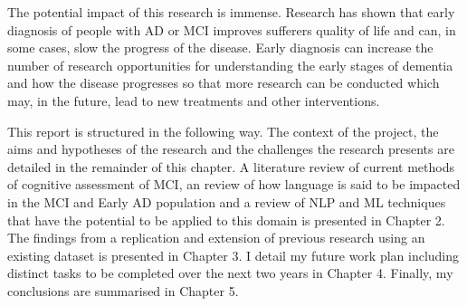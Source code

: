 \documentclass[12pt, twoside, a4paper]{article}
\begin{document}
\par
The potential impact of this research is immense. Research has shown that early diagnosis of people with AD or MCI improves sufferers quality of life and can, in some cases, slow the progress of the disease. Early diagnosis can increase the number of research opportunities for understanding the early stages of dementia and how the disease progresses so that more research can be conducted which may, in the future, lead to new treatments and other interventions.
\par
This report is structured in the following way. The context of the project, the aims and hypotheses of the research and the challenges the research presents are detailed in the remainder of this chapter. A literature review of current methods of cognitive assessment of MCI, an review of how language is said to be impacted in the MCI and Early AD population and a review of NLP and ML techniques that have the potential to be applied to this domain is presented in Chapter 2. The findings from a replication and extension of previous research using an existing dataset is presented in Chapter 3. I detail my future work plan including distinct tasks to be completed over the next two years in Chapter 4. Finally, my conclusions are summarised in Chapter 5.  
\end{document}
